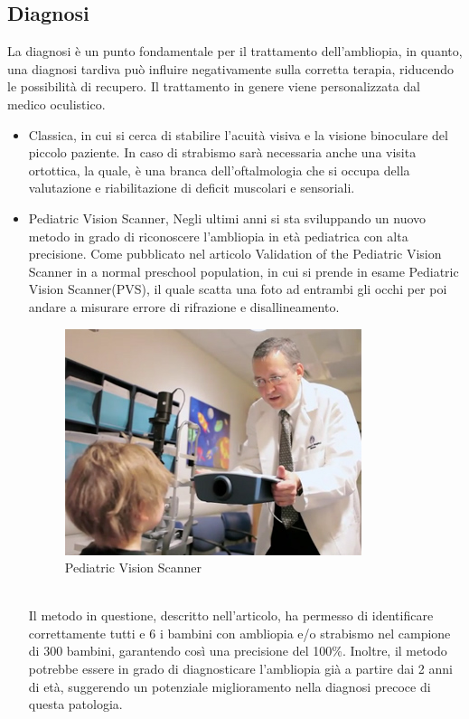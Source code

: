\documentclass[10pt,a4paper]{article}
\begin{document}
	\subsection{Diagnosi}
	La diagnosi è un punto fondamentale per il trattamento dell'ambliopia, in quanto, una diagnosi tardiva può influire negativamente sulla corretta terapia, riducendo le possibilità di recupero.
	Il trattamento in genere viene personalizzata dal medico oculistico.
	\begin{itemize}
		\item Classica, in cui si cerca di stabilire l'acuità visiva e la visione binoculare del piccolo paziente. In caso di strabismo sarà necessaria anche una visita ortottica, la quale, è una branca dell'oftalmologia che si occupa della valutazione e riabilitazione di deficit muscolari e sensoriali.
		\item Pediatric Vision Scanner, Negli ultimi anni si sta sviluppando un nuovo metodo in grado di riconoscere l'ambliopia in età pediatrica con alta precisione.
		Come pubblicato nel articolo Validation of the Pediatric Vision Scanner in a normal preschool population, in cui si prende in esame Pediatric Vision Scanner(PVS), il quale scatta una foto ad entrambi gli occhi per poi andare a misurare errore di rifrazione e disallineamento.
			\begin{figure}[h]
				\centering
				\includegraphics[width=0.7\linewidth]{image/pvs}
				\caption{Pediatric Vision Scanner\cite{PVS_image}}
				\label{fig:pvs}
	    	\end{figure}\\
        Il metodo in questione, descritto nell'articolo, ha permesso di identificare correttamente tutti e 6 i bambini con ambliopia e/o strabismo nel campione di 300 bambini, garantendo così una precisione del 100\%. Inoltre, il metodo potrebbe essere in grado di diagnosticare l'ambliopia già a partire dai 2 anni di età, suggerendo un potenziale miglioramento nella diagnosi precoce di questa patologia.
	
	\end{itemize}
   
\end{document}
